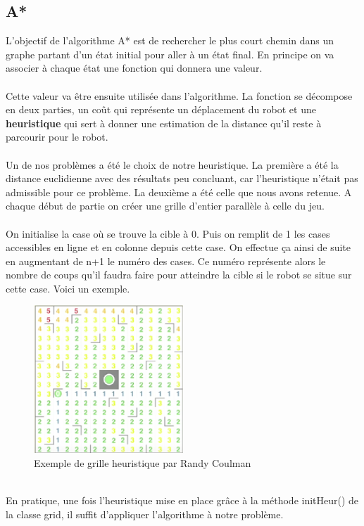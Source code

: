 \documentclass{article}
\begin{document}
\subsection{A*}
L'objectif de l'algorithme A* est de rechercher le plus court chemin dans un graphe partant d'un état initial pour aller à un état final. En principe on va associer à chaque état une fonction qui donnera une valeur.\\\\ Cette valeur va être ensuite utilisée dans l'algorithme. La fonction se décompose en deux parties, un coût qui représente un déplacement du robot et une \textbf{heuristique} qui sert à donner une estimation de la distance qu'il reste à parcourir pour le robot.\\\\
Un de nos problèmes a été le choix de notre heuristique. La première a été la distance euclidienne avec des résultats peu concluant, car l'heuristique n'était pas admissible pour ce problème. La deuxième a été celle que nous avons retenue. A chaque début de partie on créer une grille d'entier parallèle à celle du jeu.\\\\ On initialise la case où se trouve la cible à 0. Puis on remplit de 1 les cases accessibles en ligne et en colonne depuis cette case. On effectue ça ainsi de suite en augmentant de n+1 le numéro des cases. Ce numéro représente alors le nombre de coups qu'il faudra faire pour atteindre la cible si le robot se situe sur cette case. Voici un exemple.
\begin{figure}[!h]
  \centering  
  \includegraphics[width=0.5\textwidth]{init.png}  
  \caption{Exemple de grille heuristique par Randy Coulman} 
  \label{fig:Diagram}  
\end{figure}\\
En pratique, une fois l'heuristique mise en place grâce à la méthode initHeur() de la classe grid, il suffit d'appliquer l'algorithme à notre problème.
\end{document}
